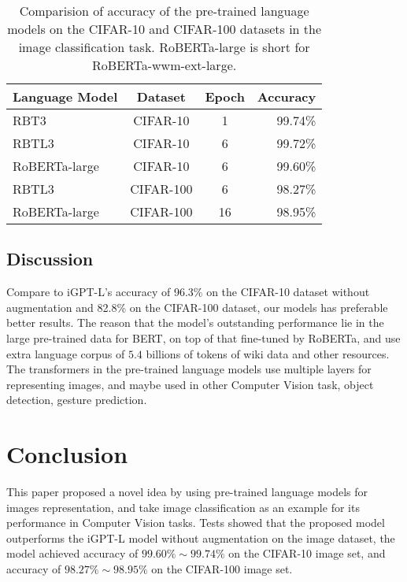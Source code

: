 \documentclass[review]{cvpr}
\begin{document}
\begin{table}
\begin{center}
\begin{tabular}{|l|c|c|r|}
\hline
Language Model 	& Dataset & Epoch & Accuracy \\
\hline\hline
RBT3   & CIFAR-10 & 1	&	99.74\% \\
RBTL3  & CIFAR-10 & 6	&	99.72\% \\
RoBERTa-large  & CIFAR-10 & 6	&	99.60\% \\
RBTL3  & CIFAR-100 & 6  & 	98.27\% \\
RoBERTa-large & CIFAR-100 & 16 &	98.95\% \\
\hline
\end{tabular}
\end{center}
\caption{Comparision of accuracy of the pre-trained language models on the CIFAR-10 and CIFAR-100 datasets in the image classification task.
RoBERTa-large is short for RoBERTa-wwm-ext-large.}
\end{table}


\subsection{Discussion}

 Compare to iGPT-L's accuracy of 96.3\% on the CIFAR-10 dataset without augmentation and 82.8\% on the CIFAR-100 dataset, our models has preferable better results.
The reason that the model's outstanding performance lie in the large pre-trained data for BERT, on top of that fine-tuned by RoBERTa, and use extra language corpus of
$5.4$ billions of tokens of wiki data and other resources.
The transformers in the pre-trained language models use multiple layers for representing images, and maybe used in other Computer Vision task, \eg object detection, gesture prediction.


\section{Conclusion}

This paper proposed a novel idea by using pre-trained language models for images representation, and take image classification as an example for its performance in Computer Vision tasks.
Tests showed that the proposed model outperforms the iGPT-L model without augmentation on the image dataset,
the model achieved accuracy of $99.60\%\sim99.74\%$ on the CIFAR-10 image set,
and accuracy of $98.27\%\sim98.95\%$ on the CIFAR-100 image set.


{\small


}
\end{document}
